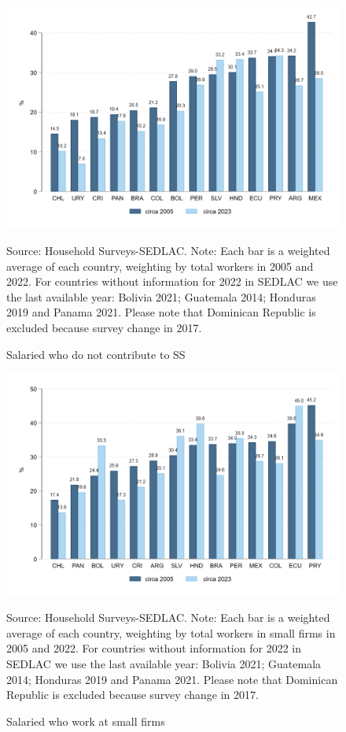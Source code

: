 \documentclass[english]{article}
\begin{document}
\begin{figure}[H]
    \justifying
     \caption{Salaried who do not contribute to SS}     
     \centerline{\includegraphics[scale=.3]{latex/figures/Snapshot/snapshot_informal_ss_dep.png}
    \label{fig:SalariedSS}}
    \footnotesize{Source: Household Surveys-SEDLAC.}
    \footnotesize{Note: Each bar is a weighted average of each country, weighting by total workers in 2005 and 2022. For countries without information for 2022 in SEDLAC we use the last available year: Bolivia 2021; Guatemala 2014; Honduras 2019 and Panama 2021. Please note that Dominican Republic is excluded because survey change in 2017.}
\end{figure}

\begin{figure}[H]
    \justifying
     \caption{Salaried who work at small firms}     
     \centerline{\includegraphics[scale=.3]{latex/figures/Snapshot/snapshot_dependents_small.png}
    \label{fig:SalariedSmall}}
    \footnotesize{Source: Household Surveys-SEDLAC.}
    \footnotesize{Note: Each bar is a weighted average of each country, weighting by total workers in small firms in 2005 and 2022. For countries without information for 2022 in SEDLAC we use the last available year: Bolivia 2021; Guatemala 2014; Honduras 2019 and Panama 2021. Please note that Dominican Republic is excluded because survey change in 2017.}
\end{figure}
\end{document}
